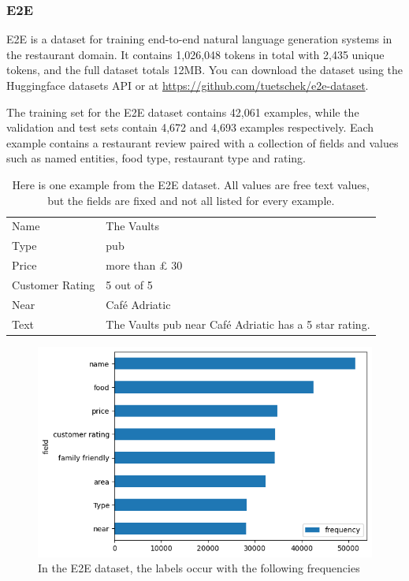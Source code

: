 \subsubsection{E2E}

E2E is a dataset for training end-to-end natural language generation systems in the restaurant domain. It contains 1,026,048 tokens in total with 2,435 unique tokens, and the full dataset totals 12MB. You can download the dataset using the Huggingface datasets API or at \href{https://github.com/tuetschek/e2e-dataset}{https://github.com/tuetschek/e2e-dataset}.

The training set for the E2E dataset contains 42,061 examples, while the validation and test sets contain 4,672 and 4,693 examples respectively. Each example contains a restaurant review paired with a collection of fields and values such as named entities, food type, restaurant type and rating.

\begin{table}
  \centering
  \begin{tabular}{ | m{3cm} | m{7cm}| } 
    \hline
    Name & The Vaults \\ 
    Type & pub \\ 
    Price & more than £ 30 \\
    Customer Rating & 5 out of 5 \\
    Near & Café Adriatic \\
    Text & The Vaults pub near Café Adriatic has a 5 star rating. \\
    \hline
  \end{tabular}
  \caption{Here is one example from the E2E dataset. All values are free text values, but the fields are fixed and not all listed for every example.}
\end{table}

\begin{figure}[h]
  \includegraphics[scale=0.6]{images/e2e-field-frequencies.png}
  \centering
  \caption{In the E2E dataset, the labels occur with the following frequencies}
  \label{fig:e2e-field-frequencies}
\end{figure}

